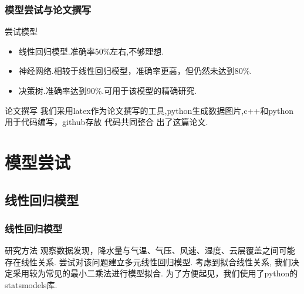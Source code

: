 \documentclass[10pt]{beamer}
\begin{document}
\begin{frame}
	\frametitle{模型尝试与论文撰写}
	\begin{block}{尝试模型}
		\begin{itemize}
			\item 线性回归模型.准确率50\%左右,不够理想.
			\item 神经网络.相较于线性回归模型，准确率更高，但仍然未达到80\%.
			\item 决策树.准确率达到90\%.可用于该模型的精确研究.
		\end{itemize}
	\end{block}
	\begin{block}{论文撰写}
		我们采用latex作为论文撰写的工具,python生成数据图片,c++和python用于代码编写，github存放
		代码共同整合
		出了这篇论文.
	\end{block}
\end{frame}

\section{模型尝试}
\subsection{线性回归模型}
\begin{frame}
	\frametitle{线性回归模型}

	\begin{block}{研究方法}
		观察数据发现，降水量与气温、气压、风速、湿度、云层覆盖之间可能存在线性关系.
		尝试对该问题建立多元线性回归模型.
		考虑到拟合线性关系, 我们决定采用较为常见的最小二乘法进行模型拟合.
		为了方便起见，我们使用了python的statsmodels库.
	\end{block}
\end{frame}
\end{document}
